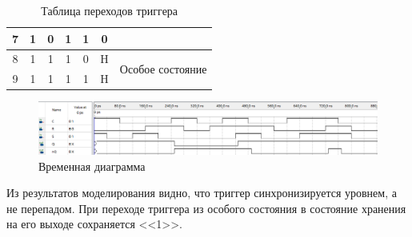 \documentclass[a4paper,12pt]{article}
\begin{document}
\begin{table}[H]
\begin{tabular}{|c|ccc|cc|c|}
        7                                                                               & \multicolumn{1}{c|}{1}      & \multicolumn{1}{c|}{0}      & 1      & \multicolumn{1}{c|}{1}      & 0        &                                   \\ \hline
        8                                                                               & \multicolumn{1}{c|}{1}      & \multicolumn{1}{c|}{1}      & 1      & \multicolumn{1}{c|}{0}      & H        & \multirow{2}{*}{Особое состояние} \\ \cline{1-6}
        9                                                                               & \multicolumn{1}{c|}{1}      & \multicolumn{1}{c|}{1}      & 1      & \multicolumn{1}{c|}{1}      & H        &                                   \\ \hline
        \end{tabular}
        \caption{Таблица переходов триггера}
        \label{tab:tab-2}
    \end{table}
    \begin{figure}[H]
		\centering
		\includegraphics[width=\linewidth]{polytech/scheme/report-lab3/subfiles/images/wave-2}
		\caption{Временная диаграмма}
		\label{fig:wave-2}
	\end{figure}
    Из результатов моделирования видно, что триггер синхронизируется уровнем, а не перепадом.
    При переходе триггера из особого состояния в состояние хранения на его выходе сохраняется <<1>>.
    
\end{document}
